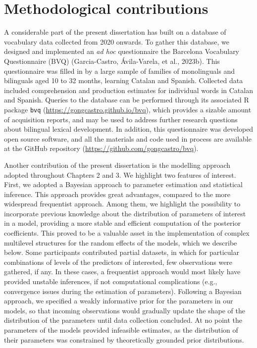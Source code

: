 \documentclass[
  12pt,
  b5paperpaper,
  twoside]{scrreprt}
\begin{document}
\hypertarget{methodological-contributions}{%
\section{Methodological
contributions}\label{methodological-contributions}}

A considerable part of the present dissertation has built on a database
of vocabulary data collected from 2020 onwards. To gather this database,
we designed and implemented an \emph{ad hoc} questionnaire the Barcelona
Vocabulary Questionnaire (BVQ) (Garcia-Castro, Ávila-Varela, et al.,
2023b). This questionnaire was filled in by a large sample of families
of monolinguals and bilinguals aged 10 to 32 months, learning Catalan
and Spanish. Collected data included comprehension and production
estimates for individual words in Catalan and Spanish. Queries to the
database can be performed through its associated R package \texttt{bvq}
(\url{https://gongcastro.github.io/bvq}), which provides a sizable
amount of acquisition reports, and may be used to address further
research questions about bilingual lexical development. In addition,
this questionnaire was developed open source software, and all the
materials and code used in process are available at the GitHub
repository (\url{https://github.com/gongcastro/bvq}).

Another contribution of the present dissertation is the modelling
approach adopted throughout Chapters 2 and 3. We highlight two features
of interest. First, we adopted a Bayesian approach to parameter
estimation and statistical inference. This approach provides great
advantages, compared to the more widespread frequentist approach. Among
them, we highlight the possibility to incorporate previous knowledge
about the distribution of parameters of interest in a model, providing a
more stable and efficient computation of the posterior coefficients.
This proved to be a valuable asset in the implementation of complex
multilevel structures for the random effects of the models, which we
describe below. Some participants contributed partial datasets, in which
for particular combinations of levels of the predictors of interested,
few observations were gathered, if any. In these cases, a frequentist
approach would most likely have provided unstable inferences, if not
computational complications (e.g., convergence issues during the
estimation of parameters). Following a Bayesian approach, we specified a
weakly informative prior for the parameters in our models, so that
incoming observations would gradually update the shape of the
distribution of the parameters until data collection concluded. At no
point the parameters of the models provided infeasible estimates, as the
distribution of their parameters was constrained by theoretically
grounded prior distributions.
\end{document}
